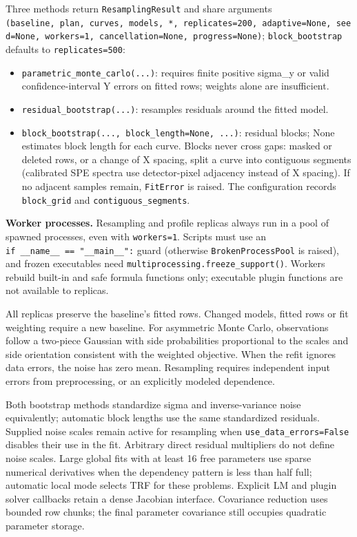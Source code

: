 \documentclass[
  10pt,
  a4paper,
  oneside]{scrreprt}
\providecommand{\tightlist}{%
  \setlength{\itemsep}{0pt}\setlength{\parskip}{0pt}}
\begin{document}
Three methods return \texttt{ResamplingResult} and share arguments
\texttt{(baseline,\ plan,\ curves,\ models,\ *,\ replicates=200,\ adaptive=None,\ seed=None,\ workers=1,\ cancellation=None,\ progress=None)};
\texttt{block\_bootstrap} defaults to \texttt{replicates=500}:

\begin{itemize}
\tightlist
\item
  \texttt{parametric\_monte\_carlo(...)}: requires finite positive
  sigma\_y or valid confidence-interval Y errors on fitted rows; weights
  alone are insufficient.
\item
  \texttt{residual\_bootstrap(...)}: resamples residuals around the
  fitted model.
\item
  \texttt{block\_bootstrap(...,\ block\_length=None,\ ...)}: residual
  blocks; None estimates block length for each curve. Blocks never cross
  gaps: masked or deleted rows, or a change of X spacing, split a curve
  into contiguous segments (calibrated SPE spectra use detector-pixel
  adjacency instead of X spacing). If no adjacent samples remain,
  \texttt{FitError} is raised. The configuration records
  \texttt{block\_grid} and \texttt{contiguous\_segments}.
\end{itemize}

\textbf{Worker processes.} Resampling and profile replicas always run in
a pool of spawned processes, even with \texttt{workers=1}. Scripts must
use an \texttt{if\ \_\_name\_\_\ ==\ "\_\_main\_\_":} guard (otherwise
\texttt{BrokenProcessPool} is raised), and frozen executables need
\texttt{multiprocessing.freeze\_support()}. Workers rebuild built-in and
safe formula functions only; executable plugin functions are not
available to replicas.

All replicas preserve the baseline's fitted rows. Changed models, fitted
rows or fit weighting require a new baseline. For asymmetric Monte
Carlo, observations follow a two-piece Gaussian with side probabilities
proportional to the scales and side orientation consistent with the
weighted objective. When the refit ignores data errors, the noise has
zero mean. Resampling requires independent input errors from
preprocessing, or an explicitly modeled dependence.

Both bootstrap methods standardize sigma and inverse-variance noise
equivalently; automatic block lengths use the same standardized
residuals. Supplied noise scales remain active for resampling when
\texttt{use\_data\_errors=False} disables their use in the fit.
Arbitrary direct residual multipliers do not define noise scales. Large
global fits with at least 16 free parameters use sparse numerical
derivatives when the dependency pattern is less than half full;
automatic local mode selects TRF for these problems. Explicit LM and
plugin solver callbacks retain a dense Jacobian interface. Covariance
reduction uses bounded row chunks; the final parameter covariance still
occupies quadratic parameter storage.
\end{document}
